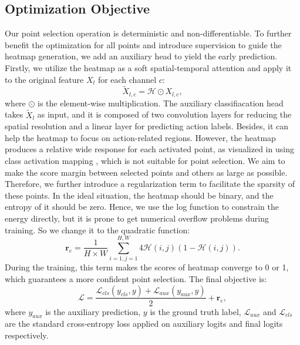 \documentclass[journal]{IEEEtran}
\begin{document}
\subsection{Optimization Objective}
Our point selection operation is deterministic and non-differentiable.
To further benefit the optimization for all points and introduce supervision to guide the heatmap generation, we add an auxiliary head to yield the early prediction.
Firstly, we utilize the heatmap as a soft spatial-temporal attention and apply it to the original feature $X_l$ for each channel $c$:
\begin{equation}
	\tilde{X}_{l,c} = \mathcal{H}\odot X_{l,c},
\end{equation}
where $\odot$ is the element-wise multiplication.
The auxiliary classifiacation head takes $\tilde{X}_l$ as input, and it is composed of two convolution layers for reducing the spatial resolution and a linear layer for predicting action labels.
Besides, it can help the heatmap to focus on action-related regions.
However, the heatmap produces a relative wide response for each activated point, as visualized in \cite{wang2021tdn, sudhakaran2020gate} using class activation mapping \cite{zhou2016learning}, which is not suitable for point selection.
We aim to make the score margin between selected points and others as large as possible.
Therefore, we further introduce a regularization term to facilitate the sparsity of these points.
In the ideal situation, the heatmap should be binary, and the entropy of it should be zero.
Hence, we use the log function to constrain the energy directly, but it is prone to get numerical overflow problems during training.
So we change it to the quadratic function:
\begin{equation}
	\label{eq:reg}
	\mathbf{r}_e = \frac{1}{H\times W}\sum_{i=1,j=1}^{H,W}4\mathcal{H}(i,j)(1-\mathcal{H}(i,j)).
\end{equation}
During the training, this term makes the scores of heatmap converge to 0 or 1, which guarantees a more confident point selection.
The final objective is:
\begin{equation}
	\mathcal{L} = \frac{\mathcal{L}_{cls}(y_{cls}, y)+\mathcal{L}_{aux}(y_{aux},y)}{2}+\mathbf{r}_e,
\end{equation}
where $y_{aux}$ is the auxiliary prediction, $y$ is the ground truth label, $\mathcal{L}_{aux}$ and $\mathcal{L}_{cls}$ are the standard cross-entropy loss applied on auxiliary logits and final logits respectively.
\end{document}
